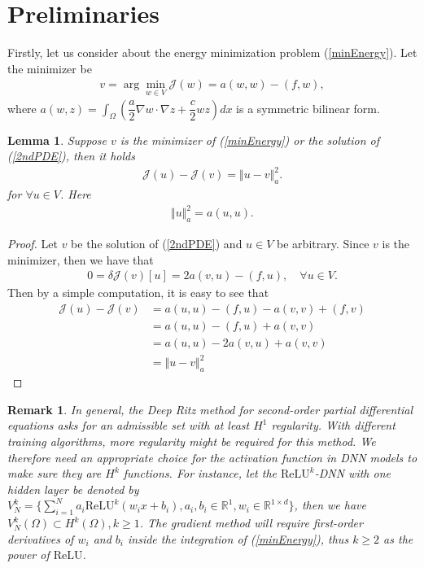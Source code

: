 \documentclass[a4paper, 11pt]{article}
\numberwithin{equation}{section}
\newtheorem{lemma}{\textbf{Lemma}}
\newtheorem{remark}{\textbf{Remark}}
\begin{document}
\section{Preliminaries}
\quad {} Firstly, let us consider about the energy minimization problem (\ref{minEnergy}). Let the minimizer be 
\begin{align} \label{minimizer}
v = \arg\min_{w\in V} \mathcal{J}(w) = a(w,w) - (f,w),
\end{align} 
where $a(w,z) = \int_{\Omega} \left(\dfrac{a}{2} \nabla w \cdot \nabla z + \dfrac{c}{2} wz\right) dx$ is a symmetric bilinear form. 

\begin{lemma}\label{lemma1}
Suppose $v$ is the minimizer of (\ref{minEnergy}) or the solution of (\ref{2ndPDE}), then it holds
\begin{align}
\mathcal{J}(u) - \mathcal{J}(v) = \Vert u-v \Vert_a^2.
\end{align}
for $\forall u\in V$. Here 
\begin{align}
\Vert u \Vert_a^2 = a(u,u).
\end{align}
\end{lemma}
\begin{proof}
Let $v$ be the solution of (\ref{2ndPDE}) and $u\in V$ be arbitrary. Since $v$ is the minimizer, then we have that 
\begin{align}
0 = \delta \mathcal{J}(v)[u] = 2a(v,u) - (f,u), \quad \forall u \in V.
\end{align}
Then by a simple computation, it is easy to see that
\begin{align}
\mathcal{J}(u) - \mathcal{J}(v) &=  a(u,u) - (f,u) -  a(v,v) + (f,v)\\
& = a(u,u) - (f,u) + a(v,v) \\
& = a(u,u) - 2a(v,u) + a(v,v) \\
& = \Vert u-v \Vert_a^2
\end{align}
\end{proof}

\begin{remark}
In general,  the Deep Ritz method for second-order partial differential equations asks for an admissible set with at least $H^1$ regularity. With different training algorithms, more regularity might be required for this method. We therefore need an appropriate choice for the activation function in DNN models to make sure they are $H^k$ functions. For instance, let the $\text{ReLU}^k$-DNN with one hidden layer be denoted by $V_N^k = \lbrace \sum_{i=1}^{N} a_{i}\text{ReLU}^k\left(w_{i} x+b_{i}\right), a_{i}, b_{i} \in \mathbb{R}^{1}, w_{i} \in \mathbb{R}^{1 \times d} \rbrace$, then we have $V_N^k(\Omega) \subset H^k(\Omega), k\geq 1$. The gradient method will require first-order derivatives of $w_i$ and $b_i$ inside the integration of (\ref{minEnergy}), thus $k\geq 2$ as the power of $\text{ReLU}$.
\end{remark}
\end{document}
